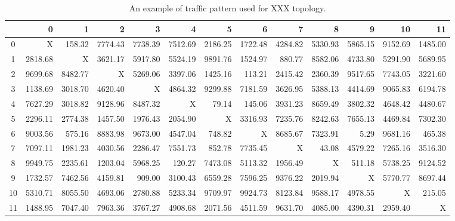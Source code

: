 \cite{rfc6462,rfc6463,rfc6468,rfc6470,rfc6471,rfc6475}

\begin{table}
	\scriptsize
	\centering
	\caption{An example of traffic pattern used for XXX topology.}
	\begin{tabular}{c|rrrrrrrrrrrr}
		{} &       0  &       1  &       2  &       3  &       4  &       5  &       6  &       7  &       8  &       9  &       10 &       11 \\
		\hline
		0  &      X &   158.32 &  7774.43 &  7738.39 &  7512.69 &  2186.25 &  1722.48 &  4284.82 &  5330.93 &  5865.15 &  9152.69 &  1485.00 \\
		1  &  2818.68 &      X &  3621.17 &  5917.80 &  5524.19 &  9891.76 &  1524.97 &   880.77 &  8582.06 &  4733.80 &  5291.90 &  5689.95 \\
		2  &  9699.68 &  8482.77 &      X &  5269.06 &  3397.06 &  1425.16 &   113.21 &  2415.42 &  2360.39 &  9517.65 &  7743.05 &  3221.60 \\
		3  &  1138.69 &  3018.70 &  4620.40 &      X &  4864.32 &  9299.88 &  7181.59 &  3626.95 &  5388.13 &  4414.69 &  9065.83 &  6194.78 \\
		4  &  7627.29 &  3018.82 &  9128.96 &  8487.32 &      X &    79.14 &   145.06 &  3931.23 &  8659.49 &  3802.32 &  4648.42 &  4480.67 \\
		5  &  2296.11 &  2774.38 &  1457.50 &  1976.43 &  2054.90 &      X &  3316.93 &  7235.76 &  8242.63 &  7655.13 &  4469.84 &  7302.30 \\
		6  &  9003.56 &   575.16 &  8883.98 &  9673.00 &  4547.04 &   748.82 &      X &  8685.67 &  7323.91 &     5.29 &  9681.16 &   465.38 \\
		7  &  7097.11 &  1981.23 &  4030.56 &  2286.47 &  7551.73 &   852.78 &  7735.45 &      X &    43.08 &  4579.22 &  7265.16 &  3516.30 \\
		8  &  9949.75 &  2235.61 &  1203.04 &  5968.25 &   120.27 &  7473.08 &  5113.32 &  1956.49 &      X &   511.18 &  5738.25 &  9124.52 \\
		9  &  1732.57 &  7462.56 &  4159.81 &   909.00 &  3100.43 &  6559.28 &  7596.25 &  9376.22 &  2019.94 &      X &  5770.77 &  8697.44 \\
		10 &  5310.71 &  8055.50 &  4693.06 &  2780.88 &  5233.34 &  9709.97 &  9924.73 &  8123.84 &  9588.17 &  4978.55 &      X &   215.05 \\
		11 &  1488.95 &  7047.40 &  7963.36 &  3767.27 &  4908.68 &  2071.56 &  4511.59 &  9631.70 &  4085.00 &  4390.31 &  2959.40 &      X \\
	\end{tabular}
	\label{tab:example}
\end{table}


